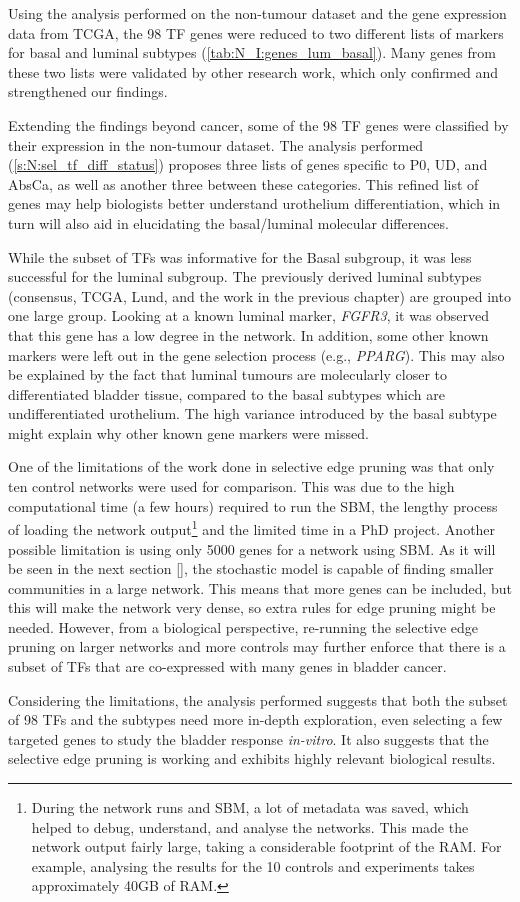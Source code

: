 Using the analysis performed on the non-tumour dataset and the gene expression data from TCGA, the 98 TF genes were reduced to two different lists of markers for basal and luminal subtypes (\cref{tab:N_I:genes_lum_basal}). Many genes from these two lists were validated by other research work, which only confirmed and strengthened our findings.

Extending the findings beyond cancer, some of the 98 TF genes were classified by their expression in the non-tumour dataset. The analysis performed (\cref{s:N:sel_tf_diff_status}) proposes three lists of genes specific to P0, UD, and AbsCa, as well as another three between these categories. This refined list of genes may help biologists better understand urothelium differentiation, which in turn will also aid in elucidating the basal/luminal molecular differences.

While the subset of TFs was informative for the Basal subgroup, it was less successful for the luminal subgroup. The previously derived luminal subtypes (consensus, TCGA, Lund, and the work in the previous chapter) are grouped into one large group. Looking at a known luminal marker, \textit{FGFR3}, it was observed that this gene has a low degree in the network. In addition, some other known markers were left out in the gene selection process (e.g., \textit{PPARG}). This may also be explained by the fact that luminal tumours are molecularly closer to differentiated bladder tissue, compared to the basal subtypes which are undifferentiated urothelium. The high variance introduced by the basal subtype might explain why other known gene markers were missed.

One of the limitations of the work done in selective edge pruning was that only ten control networks were used for comparison. This was due to the high computational time (a few hours) required to run the SBM, the lengthy process of loading the network output\footnote{During the network runs and SBM, a lot of metadata was saved, which helped to debug, understand, and analyse the networks. This made the network output fairly large, taking a considerable footprint of the RAM. For example, analysing the results for the 10 controls and experiments takes approximately 40GB of RAM.} and the limited time in a PhD project. Another possible limitation is using only 5000 genes for a network using SBM. As it will be seen in the next section \ref{}, the stochastic model is capable of finding smaller communities in a large network. This means that more genes can be included, but this will make the network very dense, so extra rules for edge pruning might be needed. However, from a biological perspective, re-running the selective edge pruning on larger networks and more controls may further enforce that there is a subset of TFs that are co-expressed with many genes in bladder cancer.

Considering the limitations, the analysis performed suggests that both the subset of 98 TFs and the subtypes need more in-depth exploration, even selecting a few targeted genes to study the bladder response \textit{in-vitro}. It also suggests that the selective edge pruning is working and exhibits highly relevant biological results.
